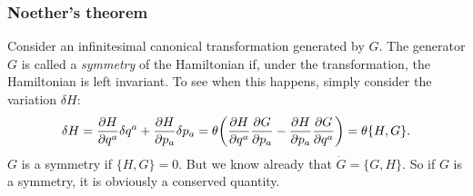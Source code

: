 \documentclass{article}
\begin{document}
\subsubsection{Noether's theorem}
Consider an infinitesimal canonical transformation generated by $ G $. The generator $ G $ is called a \textit{symmetry} of the Hamiltonian if, under the transformation, the Hamiltonian is left invariant. To see when this happens, simply consider the variation $\delta H$:
\begin{equation}
	\delta H = \pdv{H}{q^{a}} \delta q^{a} + \pdv{H}{p_{a}} \delta p_{a} = \theta \qty(\pdv{H}{q^{a}} \pdv{G}{p_{a}} - \pdv{H}{p_{a}} \pdv{G}{q^{a}} ) = \theta \{ H, G \}.
\end{equation}
$ G $ is a symmetry if $ \{ H,G \}  = 0$. But we know already that $ \dot{G} = \{G, H\} $. So if $ G $ is a symmetry, it is obviously a conserved quantity. 
\end{document}
